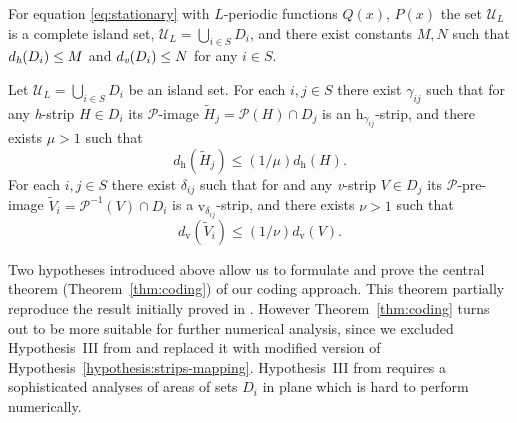 \begin{hypothesis}
\label{hypothesis:island-set}
	For equation \eqref{eq:stationary} with $L$-periodic functions $Q(x)$, $P(x)$ the set $\mathscr{U}_L$ is a complete island set, $\mathscr{U}_L = \bigcup_{i \in S} D_i$, and there exist constants $M, N$ such that $d_{\emph{h}}(D_i) \le M$ and $d_{\emph{v}}(D_i) \le N$ for any $i \in S$.
\end{hypothesis}

\begin{hypothesis}
\label{hypothesis:strips-mapping}
	Let $\mathscr{U}_L = \bigcup_{i \in S} D_i$ be an island set.
	For each $i, j \in S$ there exist $\gamma_{ij}$ such that for any \emph{h}-strip $H \in D_i$ its $\mathcal{P}$-image $\widetilde{H}_j = \mathcal{P}(H) \cap D_j$ is an $\mathrm{h}_{\gamma_{ij}}$-strip, and there exists $\mu > 1$ such that
	\begin{equation}
		d_{\mathrm{h}}(\widetilde{H}_j) \le (1/\mu) d_{\mathrm{h}}(H).
	\end{equation}
	For each $i, j \in S$ there exist $\delta_{ij}$ such that for and any \emph{v}-strip $V \in D_j$ its $\mathcal{P}$-pre-image $\widetilde{V}_i = \mathcal{P}^{-1}(V) \cap D_i$ is a $\mathrm{v}_{\delta_{ij}}$-strip, and there exists $\nu > 1$ such that
	\begin{equation}
		d_{\mathrm{v}}(\widetilde{V}_i) \le (1/\nu) d_{\mathrm{v}}(V).
	\end{equation}
\end{hypothesis}

Two hypotheses introduced above allow us to formulate and prove the central theorem (Theorem~\ref{thm:coding}) of our coding approach.
This theorem partially reproduce the result initially proved in \cite[Theorem 3.1]{AlfimovAvramenko}.
However Theorem~\ref{thm:coding} turns out to be more suitable for further numerical analysis, since we excluded Hypothesis~III from \cite{AlfimovAvramenko} and replaced it with modified version of Hypothesis~\ref{hypothesis:strips-mapping}.
Hypothesis~III from \cite{AlfimovAvramenko} requires a sophisticated analyses of areas of sets $D_i$ in plane which is hard to perform numerically.

